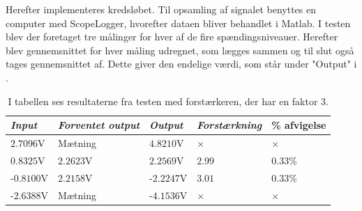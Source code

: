 \noindent Herefter implementeres kredsløbet. Til opsamling af signalet benyttes en computer med ScopeLogger, hvorefter dataen bliver behandlet i Matlab. I testen blev der foretaget tre målinger for hver af de fire spændingsniveauer. Herefter blev gennemsnittet for hver måling udregnet, som lægges sammen og til slut også tages gennemsnittet af. Dette giver den endelige værdi, som står under "Output" i .\

\begin{table}[H]
	\centering
	\begin{tabular}{|l|l|l|l|l|}
		\hline
 \textit{Input} & \textit{Forventet output} & \textit{Output}  &  \textit{Forstærkning}  & \% afvigelse \\ \hline
 $2.7096$V            & Mætning              & $4.8210$V       &    $\times$             & $\times$  \\ \hline
 $0.8325$V            & $2.2623$V            & $2.2569$V       &    $2.99$               & $0.33\%$     \\ \hline
-$0.8100$V           & $2.2158$V            & -$2.2247$V       &    $3.01$               & $0.33\%$     \\ \hline
-$2.6388$V           & Mætning              & -$4.1536$V       &    $\times$             & $\times$    \\ \hline
	\end{tabular}
	\caption{I tabellen ses resultaterne fra testen med forstærkeren, der har en faktor 3.}
	\label{Tab:faktor3_test}
\end{table}

